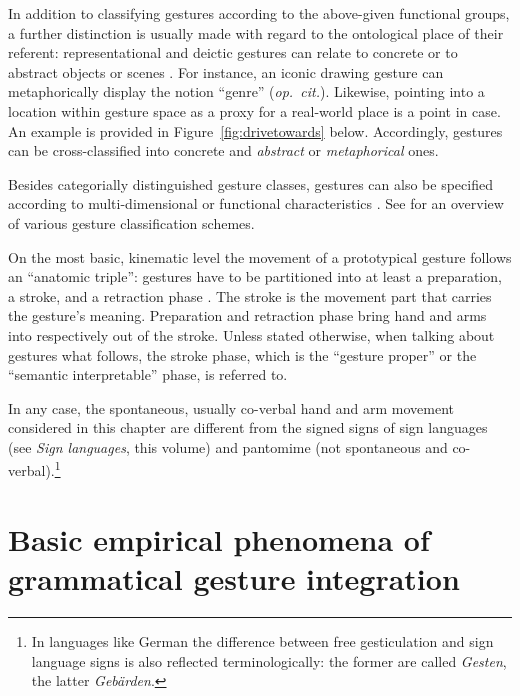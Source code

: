 \documentclass[output=paper]{langsci/langscibook}
\begin{document}
In addition to classifying gestures according to the above-given functional groups, a further distinction is usually made with regard to the ontological place of their referent: representational and deictic gestures can relate to concrete or to abstract objects or scenes \citep{McNeill:1992}. 
%
For instance, an iconic drawing gesture can metaphorically display the notion \enquote{genre} (\textit{op.~cit.}).
%
Likewise, pointing into a location within gesture space as a proxy for a real-world place is a point in case.
%
An example is provided in Figure~\ref{fig:drivetowards} below.
%
Accordingly, gestures can be cross-classified into concrete and \emph{abstract} or \emph{metaphorical}  ones.


Besides categorially distinguished gesture classes, gestures can also be specified according to multi-dimensional or functional characteristics \citep{McNeill:2005,Gerwing:Bavelas:2004}. See \citet{Ozyurek:2012} for an overview of various gesture classification schemes.


On the most basic, kinematic level the movement of a prototypical gesture follows an \enquote{anatomic triple}: gestures have to be partitioned into at least a preparation, a stroke, and a retraction     phase \citep{Kendon:1972}.
%
The stroke is the movement part that carries the gesture's meaning. 
%
Preparation and retraction phase bring hand and arms into respectively out of the stroke. 
%
Unless stated otherwise, when talking about gestures what follows, the stroke phase, which is the \enquote{gesture proper} or the \enquote{semantic interpretable} phase, is referred to.


In any case, the spontaneous, usually co-verbal hand and arm movement considered in this chapter are different from the signed signs of sign languages (see \textit{Sign languages}, this volume) and pantomime  (not spontaneous and co-verbal).\footnote{In languages like German the difference between free gesticulation and sign language signs is also reflected terminologically: the former are called \textit{Gesten}, the latter \textit{Gebärden}.}




\section{Basic empirical phenomena of grammatical gesture integration}
\label{sec:empir-desid-gramm}
\end{document}

